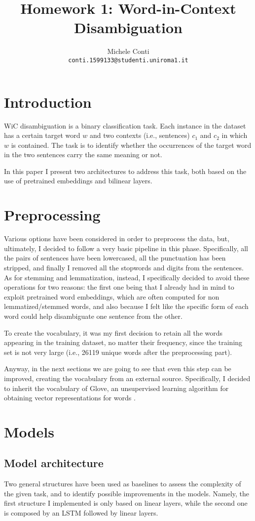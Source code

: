 \documentclass[11pt,a4paper]{article}
\title{Homework 1: Word-in-Context Disambiguation}
\author{Michele Conti \\
	\texttt{conti.1599133@studenti.uniroma1.it}\\}
\date{}
\begin{document}
	\maketitle
	\section{Introduction}
	WiC disambiguation is a binary classification task. Each instance in the dataset has a certain target word $w$ and two contexts (i.e., sentences) $c_1$ and $c_2$ in which $w$ is contained. The task is to identify whether the occurrences of the target word in the two sentences carry the same meaning or not.
	
	In this paper I present two architectures to address this task, both based on the use of pretrained embeddings and bilinear layers.

	\section{Preprocessing}	
	Various options have been considered in order to preprocess the data, but, ultimately, I decided to follow a very basic pipeline in this phase. Specifically, all the pairs of sentences have been lowercased, all the punctuation has been stripped, and finally I removed all the stopwords and digits from the sentences. As for stemming and lemmatization, instead, I specifically decided to avoid these operations for two reasons: the first one being that I already had in mind to exploit pretrained word embeddings, which are often computed for non lemmatized/stemmed words, and also because I felt like the specific form of each word could help disambiguate one sentence from the other.
	
	To create the vocabulary, it was my first decision to retain all the words appearing in the training dataset, no matter their frequency, since the training set is not very large (i.e., 26119 unique words after the preprocessing part).
	
	Anyway, in the next sections we are going to see that even this step can be improved, creating the vocabulary from an external source. Specifically, I decided to inherit the vocabulary of Glove, an unsupervised learning algorithm for obtaining vector representations for words \citep{pennington2014glove}.

	\section{Models}
	\subsection{Model architecture}
	Two general structures have been used as baselines to assess the complexity of the given task, and to identify possible improvements in the models. Namely, the first structure I implemented is only based on linear layers, while the second one is composed by an LSTM followed by linear layers.
\end{document}
